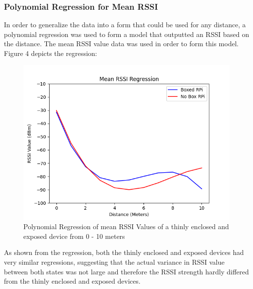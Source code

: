 \documentclass[letterpaper, 10 pt, conference]{ieeeconf}  %
\begin{document}
\subsubsection{Polynomial Regression for Mean RSSI}
In order to generalize the data into a form that could be used for any distance, a polynomial regression was used to form a model that outputted an RSSI based on the distance. The mean RSSI value data was used in order to form this model. Figure 4 depicts the regression:
   \begin{figure}[thpb]
      \centering
      \includegraphics[scale=0.5]{MeanRegression.png}
      \caption{Polynomial Regression of mean RSSI Values of a thinly enclosed and exposed device from 0 - 10 meters}
      \label{figurelabel}
   \end{figure}
\smallbreak
As shown from the regression, both the thinly enclosed and exposed devices had very similar regressions, suggesting that the actual variance in RSSI value between both states was not large and therefore the RSSI strength hardly differed from the thinly enclosed and exposed devices.
\smallbreak
\end{document}
